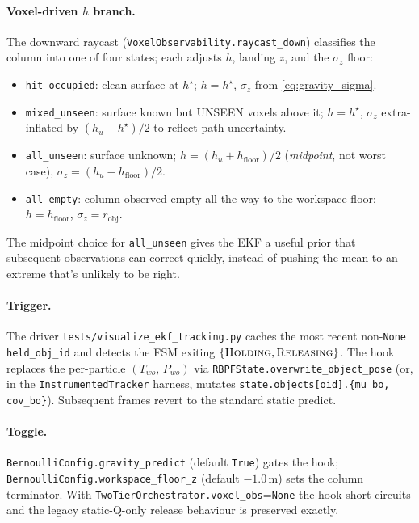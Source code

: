 \documentclass[11pt]{article}
\newcommand{\file}[1]{\texttt{#1}}
\begin{document}
\paragraph{Voxel-driven $h$ branch.}
The downward raycast (\texttt{VoxelObservability.raycast\_down})
classifies the column into one of four states; each adjusts $h$,
landing $z$, and the $\sigma_z$ floor:
\begin{itemize}[leftmargin=1.5em,itemsep=0pt,topsep=2pt]
\item \texttt{hit\_occupied}: clean surface at $h^\star$;
  $h = h^\star$, $\sigma_z$ from \eqref{eq:gravity_sigma}.
\item \texttt{mixed\_unseen}: surface known but UNSEEN voxels above
  it; $h = h^\star$, $\sigma_z$ extra-inflated by
  $(h_u - h^\star)/2$ to reflect path uncertainty.
\item \texttt{all\_unseen}: surface unknown;
  $h = (h_u + h_{\text{floor}})/2$ (\emph{midpoint}, not worst case),
  $\sigma_z = (h_u - h_{\text{floor}})/2$.
\item \texttt{all\_empty}: column observed empty all the way to the
  workspace floor; $h = h_{\text{floor}}$,
  $\sigma_z = r_{\text{obj}}$.
\end{itemize}
The midpoint choice for \texttt{all\_unseen} gives the EKF a useful
prior that subsequent observations can correct quickly, instead of
pushing the mean to an extreme that's unlikely to be right.

\paragraph{Trigger.}
The driver \file{tests/visualize\_ekf\_tracking.py} caches the most
recent non-\texttt{None} \texttt{held\_obj\_id} and detects the FSM
exiting $\{\textsc{Holding},\textsc{Releasing}\}$. The hook replaces
the per-particle $(T_{wo},\,P_{wo})$ via
\texttt{RBPFState.overwrite\_object\_pose} (or, in the
\texttt{InstrumentedTracker} harness, mutates
\texttt{state.objects[oid].\{mu\_bo,\,cov\_bo\}}). Subsequent frames
revert to the standard static predict.

\paragraph{Toggle.}
\texttt{BernoulliConfig.gravity\_predict} (default \texttt{True})
gates the hook; \texttt{BernoulliConfig.workspace\_floor\_z} (default
$-1.0$\,m) sets the column terminator. With
\texttt{TwoTierOrchestrator.voxel\_obs}=\texttt{None} the hook
short-circuits and the legacy static-Q-only release behaviour is
preserved exactly.
\end{document}
